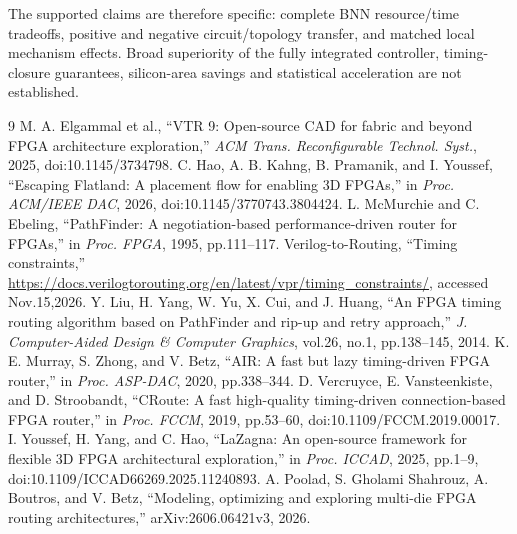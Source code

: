 \documentclass[conference,10pt]{IEEEtran}
\begin{document}
The supported claims are therefore specific: complete BNN resource/time tradeoffs, positive and negative circuit/topology transfer, and matched local mechanism effects. Broad superiority of the fully integrated controller, timing-closure guarantees, silicon-area savings and statistical acceleration are not established.
\begin{thebibliography}{9}
 M. A. Elgammal et al., ``VTR 9: Open-source CAD for fabric and beyond FPGA architecture exploration,'' \emph{ACM Trans. Reconfigurable Technol. Syst.}, 2025, doi:10.1145/3734798.
 C. Hao, A. B. Kahng, B. Pramanik, and I. Youssef, ``Escaping Flatland: A placement flow for enabling 3D FPGAs,'' in \emph{Proc. ACM/IEEE DAC}, 2026, doi:10.1145/3770743.3804424.
 L. McMurchie and C. Ebeling, ``PathFinder: A negotiation-based performance-driven router for FPGAs,'' in \emph{Proc. FPGA}, 1995, pp.111--117.
 Verilog-to-Routing, ``Timing constraints,'' \url{https://docs.verilogtorouting.org/en/latest/vpr/timing_constraints/}, accessed Nov.15,2026.
 Y. Liu, H. Yang, W. Yu, X. Cui, and J. Huang, ``An FPGA timing routing algorithm based on PathFinder and rip-up and retry approach,'' \emph{J. Computer-Aided Design \& Computer Graphics}, vol.26, no.1, pp.138--145, 2014.
 K. E. Murray, S. Zhong, and V. Betz, ``AIR: A fast but lazy timing-driven FPGA router,'' in \emph{Proc. ASP-DAC}, 2020, pp.338--344.
 D. Vercruyce, E. Vansteenkiste, and D. Stroobandt, ``CRoute: A fast high-quality timing-driven connection-based FPGA router,'' in \emph{Proc. FCCM}, 2019, pp.53--60, doi:10.1109/FCCM.2019.00017.
 I. Youssef, H. Yang, and C. Hao, ``LaZagna: An open-source framework for flexible 3D FPGA architectural exploration,'' in \emph{Proc. ICCAD}, 2025, pp.1--9, doi:10.1109/ICCAD66269.2025.11240893.
 A. Poolad, S. Gholami Shahrouz, A. Boutros, and V. Betz, ``Modeling, optimizing and exploring multi-die FPGA routing architectures,'' arXiv:2606.06421v3, 2026.
\end{thebibliography}
\end{document}
